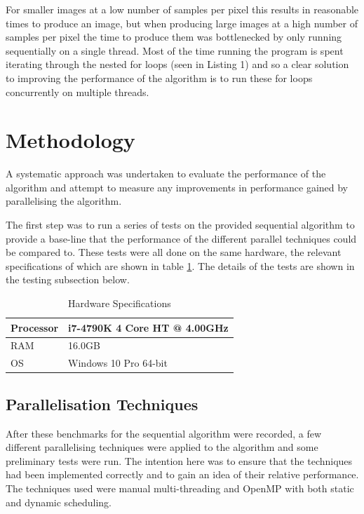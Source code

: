 \documentclass[12pt,journal,transmag]{IEEEtran}
\begin{document}
	For smaller images at a low number of samples per pixel this results in reasonable times to produce an image, but when producing large images at a high number of samples per pixel the time to produce them was bottlenecked by only running sequentially on a single thread. Most of the time running the program is spent iterating through the nested for loops (seen in Listing 1) and so a clear solution to improving the performance of the algorithm is to run these for loops concurrently on multiple threads.
	
	
	\section{Methodology}	
	A systematic approach was undertaken to evaluate the performance of the algorithm and attempt to measure any improvements in performance gained by parallelising the algorithm.
	
	The first step was to run a series of tests on the provided sequential algorithm to provide a base-line that the performance of the different parallel techniques could be compared to. These tests were all done on the same hardware, the relevant specifications of which are shown in table \ref{hardware}. The details of the tests are shown in the testing subsection below.
	
	\begin{table}[!h]
		\renewcommand{\arraystretch}{1.3}
		\caption{Hardware Specifications}
		\label{hardware}
		\centering
		\begin{tabular}{|l|l|}
			\hline
			Processor & i7-4790K 4 Core HT @ 4.00GHz\\ \hline
			RAM & 16.0GB\\ \hline
			OS & Windows 10 Pro 64-bit\\ \hline
		\end{tabular}
	\end{table}
	
	\subsection{Parallelisation Techniques}
	After these benchmarks for the sequential algorithm were recorded, a few different parallelising techniques were applied to the algorithm and some preliminary tests were run. The intention here was to ensure that the techniques had been implemented correctly and to gain an idea of their relative performance. The techniques used were manual multi-threading and OpenMP with both static and dynamic scheduling.\\
	
\end{document}
